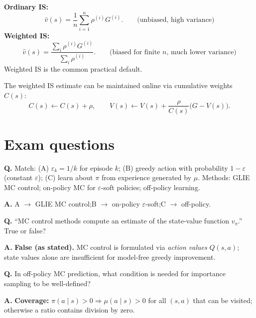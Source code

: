 \documentclass[11pt, oneside]{book}
\begin{document}
\begin{thmbox}[title={Ordinary and Weighted Importance Sampling}]
\textbf{Ordinary IS:}
\[
  \hat{v}(s) = \frac{1}{n}\sum_{i=1}^n \rho^{(i)} G^{(i)}.
  \qquad\text{(unbiased, high variance)}
\]
\textbf{Weighted IS:}
\[
  \hat{v}(s) = \frac{\sum_i \rho^{(i)} G^{(i)}}{\sum_i \rho^{(i)}}.
  \qquad\text{(biased for finite $n$, much lower variance)}
\]
Weighted IS is the common practical default.
\end{thmbox}

The weighted IS estimate can be maintained online via cumulative weights
$C(s)$:
\[
  C(s) \leftarrow C(s) + \rho, \qquad
  V(s) \leftarrow V(s) + \frac{\rho}{C(s)}\bigl(G - V(s)\bigr).
\]

\section{Exam questions}

\begin{exbox}[title={Exam: Matching MC Methods}]
\textbf{Q.} Match: (A) $\varepsilon_k=1/k$ for episode $k$;
(B) greedy action with probability $1-\varepsilon$ (constant $\varepsilon$);
(C) learn about $\pi$ from experience generated by $\mu$.
Methods: GLIE MC control; on-policy MC for $\varepsilon$-soft policies;
off-policy learning.

\medskip
\textbf{A.} A $\to$ GLIE MC control;\quad B $\to$ on-policy $\varepsilon$-soft;\quad C $\to$ off-policy.
\end{exbox}

\begin{exbox}[title={Exam: MC Control and State Values}]
\textbf{Q.} ``MC control methods compute an estimate of the state-value
function $v_\pi$.'' True or false?

\medskip
\textbf{A.} \textbf{False (as stated).} MC control is formulated via
\emph{action values} $Q(s,a)$; state values alone are insufficient for
model-free greedy improvement.
\end{exbox}

\begin{exbox}[title={Exam: Coverage Condition}]
\textbf{Q.} In off-policy MC prediction, what condition is needed for
importance sampling to be well-defined?

\medskip
\textbf{A.} \textbf{Coverage:} $\pi(a\mid s) > 0 \Rightarrow \mu(a\mid s)>0$
for all $(s,a)$ that can be visited; otherwise a ratio contains division by zero.
\end{exbox}
\end{document}
